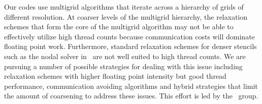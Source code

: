 

Our codes use multigrid algorithms that iterate across a hierarchy of
grids of different resolution. At coarser levels of the multigrid
hierarchy, the relaxation schemes that form the core of the multigrid
algorithm may not be able to effectively utilize high thread counts
because communication costs will dominate floating point
work. Furthermore, standard relaxation schemes for denser stencils
such as the nodal solver in \maestro\ are not well suited to high thread
counts. We are pursuing a number of possible strategies for dealing
with this issue including relaxation schemes with higher floating
point intensity but good thread performance, communication avoiding
algorithms and hybrid strategies that limit the amount of coarsening
to address these issues.  This effort is led by the \boxlib\ group.


